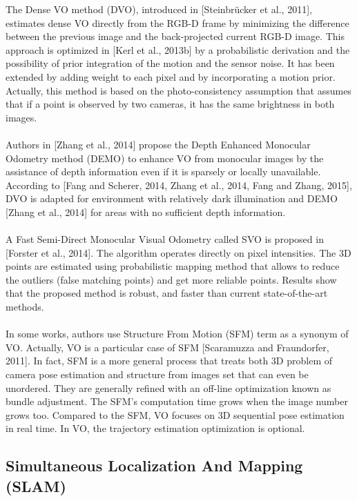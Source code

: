 The Dense VO method (DVO), introduced in [Steinbrücker et al., 2011], estimates dense
VO directly from the RGB-D frame by minimizing the diﬀerence between the previous
image and the back-projected current RGB-D image. This approach is optimized in [Kerl
        et al., 2013b] by a probabilistic derivation and the possibility of prior integration of the
motion and the sensor noise. It has been extended by adding weight to each pixel and by incorporating a motion prior. Actually, this method is based on the photo-consistency
assumption that assumes that if a point is observed by two cameras, it has the same
brightness in both images.\\\\
Authors in [Zhang et al., 2014] propose the Depth Enhanced Monocular Odometry method
(DEMO) to enhance VO from monocular images by the assistance of depth information
even if it is sparsely or locally unavailable. According to [Fang and Scherer, 2014, Zhang
        et al., 2014, Fang and Zhang, 2015], DVO is adapted for environment with relatively dark
illumination and DEMO [Zhang et al., 2014] for areas with no suﬃcient depth information.\\\\
A Fast Semi-Direct Monocular Visual Odometry called SVO is proposed in [Forster et al.,
        2014]. The algorithm operates directly on pixel intensities. The 3D points are estimated
using probabilistic mapping method that allows to reduce the outliers (false matching
points) and get more reliable points. Results show that the proposed method is robust,
and faster than current state-of-the-art methods.\\\\
In some works, authors use Structure From Motion (SFM) term as a synonym of VO.
Actually, VO is a particular case of SFM [Scaramuzza and Fraundorfer, 2011]. In fact,
SFM is a more general process that treats both 3D problem of camera pose estimation and
structure from images set that can even be unordered. They are generally reﬁned with an
oﬀ-line optimization known as bundle adjustment. The SFM’s computation time grows
when the image number grows too. Compared to the SFM, VO focuses on 3D sequential
pose estimation in real time. In VO, the trajectory estimation optimization is optional.
\subsection{Simultaneous Localization And Mapping (SLAM)}
